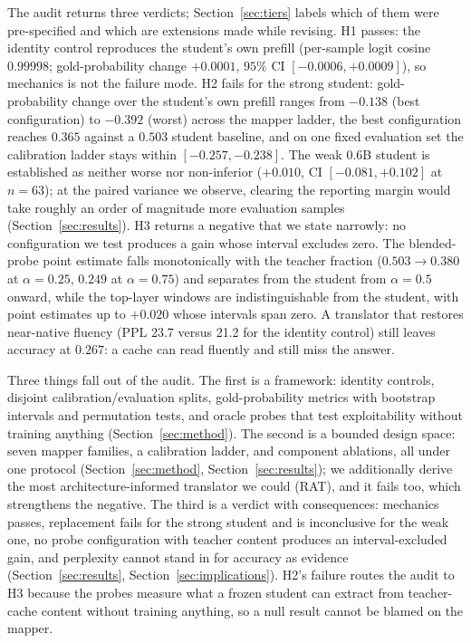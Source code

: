 \documentclass[10pt]{article}
\begin{document}
The audit returns three verdicts; Section~\ref{sec:tiers} labels which of them
were pre-specified and which are extensions made while revising. H1 passes: the
identity control reproduces the student's own prefill (per-sample logit cosine
$0.99998$; gold-probability change $+0.0001$, $95\%$ CI $[-0.0006, +0.0009]$),
so mechanics is not the failure mode. H2 fails for the strong student:
gold-probability change over the student's own prefill ranges from $-0.138$
(best configuration) to $-0.392$ (worst) across the mapper ladder, the best
configuration reaches $0.365$ against a $0.503$ student baseline, and on one
fixed evaluation set the calibration ladder stays within $[-0.257, -0.238]$.
The weak 0.6B student is established as neither worse nor non-inferior
($+0.010$, CI $[-0.081, +0.102]$ at $n{=}63$); at the paired variance we
observe, clearing the reporting margin would take roughly an order of
magnitude more evaluation samples (Section~\ref{sec:results}). H3 returns a
negative that we state narrowly: no configuration we test produces a gain whose
interval excludes zero. The blended-probe point estimate falls monotonically
with the teacher fraction ($0.503 \to 0.380$ at $\alpha{=}0.25$, $0.249$ at
$\alpha{=}0.75$) and separates from the student from $\alpha{=}0.5$ onward,
while the top-layer windows are indistinguishable from the student, with point
estimates up to $+0.020$ whose intervals span zero. A translator that restores
near-native fluency (PPL 23.7 versus 21.2 for the identity control) still leaves
accuracy at $0.267$: a cache can read fluently and still miss the answer.

Three things fall out of the audit. The first is a framework: identity
controls, disjoint calibration/evaluation splits, gold-probability metrics
with bootstrap intervals and permutation tests, and oracle probes that test
exploitability without training anything (Section~\ref{sec:method}). The
second is a bounded design space: seven mapper families, a calibration ladder,
and component ablations, all under one protocol
(Section~\ref{sec:method}, Section~\ref{sec:results}); we additionally derive
the most architecture-informed translator we could (RAT), and it fails too,
which strengthens the negative. The third is a verdict
with consequences: mechanics passes, replacement fails for the strong student
and is inconclusive for the weak one, no probe configuration with teacher
content produces an interval-excluded gain, and perplexity
cannot stand in for accuracy as evidence (Section~\ref{sec:results},
Section~\ref{sec:implications}). H2's failure routes the audit to H3
because the probes measure what a frozen student can extract from
teacher-cache content without training anything, so a null result cannot
be blamed on the mapper.
\end{document}

